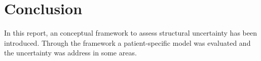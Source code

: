 \chapter{Conclusion}
\label{chapterlabel8}

In this report, an conceptual framework to assess structural uncertainty has been introduced. Through the framework a patient-specific model was evaluated and the uncertainty was address in some areas.